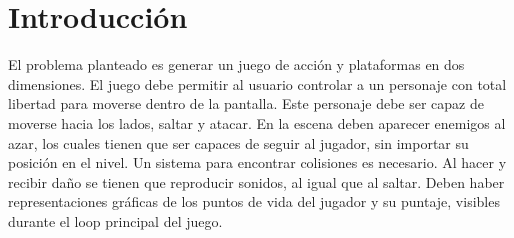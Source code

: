 \documentclass[letterpaper,11pt]{article} %
\begin{document}







\section{Introducción}
	El problema planteado es generar un juego de acción y plataformas en dos dimensiones. El juego debe permitir al usuario controlar a un personaje con total libertad para moverse dentro de la pantalla. Este personaje debe ser capaz de moverse hacia los lados, saltar y atacar. En la escena deben aparecer enemigos al azar, los cuales tienen que ser capaces de seguir al jugador, sin importar su posición en el nivel. Un sistema para encontrar colisiones es necesario. Al hacer y recibir daño se tienen que reproducir sonidos, al igual que al saltar. Deben haber representaciones gráficas de los puntos de vida del jugador y su puntaje, visibles durante el loop principal del juego.
\end{document}
